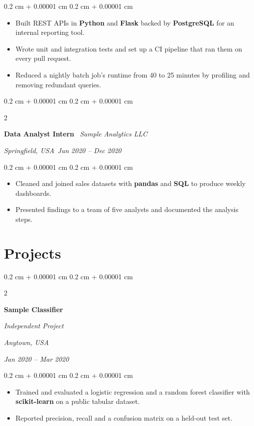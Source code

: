 \documentclass[10pt, letterpaper]{article}
\newenvironment{highlights}{
    \begin{itemize}[
        topsep=0.10 cm,
        parsep=0.10 cm,
        partopsep=0pt,
        itemsep=0pt,
        leftmargin=0.4 cm + 10pt
    ]
}{
    \end{itemize}
}
\newenvironment{onecolentry}{
    \begin{adjustwidth}{
        0.2 cm + 0.00001 cm
    }{
        0.2 cm + 0.00001 cm
    }
}{
    \end{adjustwidth}
}
\newenvironment{twocolentry}[2][]{
    \onecolentry
    \def\secondColumn{#2}
    \setcolumnwidth{\fill, 4.5 cm}
    \begin{paracol}{2}
}{
    \switchcolumn \raggedleft \secondColumn
    \end{paracol}
    \endonecolentry
}
\let\hrefWithoutArrow\href
\renewcommand{\href}[2]{\hrefWithoutArrow{#1}{\ifthenelse{\equal{#2}{}}{ }{#2 }\raisebox{.15ex}{\footnotesize \faExternalLink*}}}
\begin{document}
\begin{onecolentry}
\begin{highlights}
\item Built REST APIs in \textbf{Python} and \textbf{Flask} backed by \textbf{PostgreSQL} for an internal reporting tool.
\item Wrote unit and integration tests and set up a CI pipeline that ran them on every pull request.
\item Reduced a nightly batch job's runtime from 40 to 25 minutes by profiling and removing redundant queries.
\end{highlights}
\end{onecolentry}

\vspace{0.2 cm}

\begin{twocolentry}{
    \textit{Springfield, USA}\
    \textit{Jun 2020 -- Dec 2020}
}
    \textbf{Data Analyst Intern} \
    \textit{Sample Analytics LLC}
\end{twocolentry}

\begin{onecolentry}
\begin{highlights}
\item Cleaned and joined sales datasets with \textbf{pandas} and \textbf{SQL} to produce weekly dashboards.
\item Presented findings to a team of five analysts and documented the analysis steps.
\end{highlights}
\end{onecolentry}


\section*{Projects}

\begin{twocolentry}{
        \textit{Anytown, USA}

        \textit{Jan 2020 -- Mar 2020}}
            \textbf{Sample Classifier \href{https://github.com/your-handle/sample-project}{\faGithub}}

            \textit{Independent Project}
        \end{twocolentry}

        \vspace{0.10 cm}
        \begin{onecolentry}
            \begin{highlights}
                \item Trained and evaluated a logistic regression and a random forest classifier with \textbf{scikit-learn} on a public tabular dataset.
                \item Reported precision, recall and a confusion matrix on a held-out test set.
            \end{highlights}
        \end{onecolentry}
\end{document}
